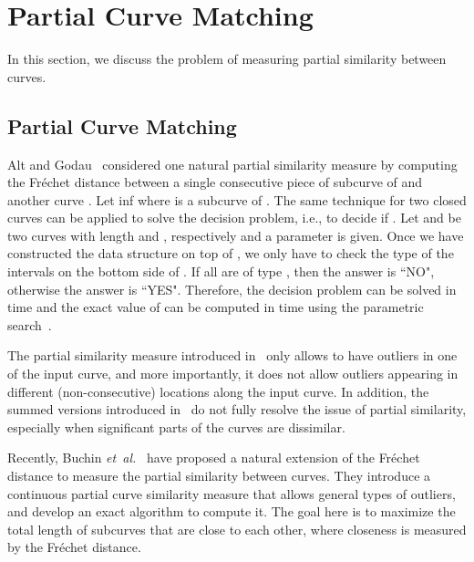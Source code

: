 \documentclass[12pt]{dalthesis}
\newcommand{\etal}{{\em et~al.\/}}
\newcommand{\Frechet}{Fr\'echet }
\begin{document}
 

















\section{Partial Curve Matching}
\label{sec:RelatedPartial}
In this section, we discuss the problem
of measuring partial similarity between curves.

 

\subsection{Partial Curve Matching}
\label{sec:RelatedPartialMain}
Alt and Godau~\cite{AltG95} considered one natural partial similarity 
measure by computing the \Frechet distance between a single 
consecutive piece of subcurve of  and another curve . 
Let  inf  where  is a subcurve of . 
The same technique for two closed curves 
 can be applied to solve the decision problem, i.e., to decide if . Let  
and  be two curves with length  and , respectively and a parameter  is given. Once we have constructed 
the data structure on top of , 
we only have to check the type of the intervals on the bottom side of 
. If all are of type , then the answer is ``NO", otherwise the 
answer is ``YES". Therefore, the decision problem can be solved in   time and the exact value of  
can be computed in  time using the 
parametric search~\cite{AltG95}.

The partial similarity measure introduced in~\cite{AltG95}  
only allows to have outliers in one of the input curve, and more importantly, 
it does not allow outliers
appearing in different (non-consecutive) locations along the input curve. 
In addition, the summed versions introduced in~\cite{SumFD} do 
not fully resolve the issue of partial similarity, especially when significant parts 
of the curves are dissimilar. 

Recently, Buchin \etal~\cite{ExactPartial} have
proposed a natural extension of the
\Frechet distance to measure the partial similarity between
curves. 
They introduce a continuous
partial curve similarity measure that allows general
types of outliers, and develop an exact algorithm to
compute it. The goal here is to maximize the total length of 
subcurves that are close to each other, where closeness is measured by 
the \Frechet distance. 
\end{document}
